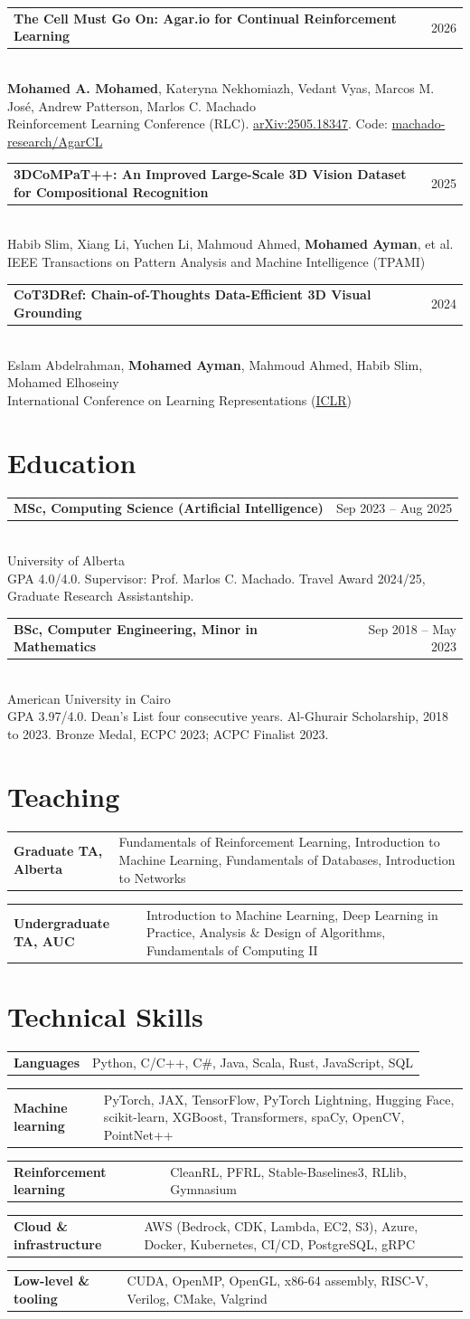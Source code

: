 \documentclass[10pt,a4paper]{article}
\makeatletter
\newcommand{\degree}[4]{%
  \vspace{4pt}
  \noindent\begin{tabularx}{\textwidth}{@{}Xr@{}}
    \textbf{#1} & \textcolor{muted}{\small #3}
  \end{tabularx}\\[1pt]
  \textcolor{accent}{#2}\\[1pt]
  {\small\textcolor{muted}{#4}}\vspace{2pt}
}
\newcommand{\paper}[4]{%
  \vspace{4pt}
  \noindent\begin{tabularx}{\textwidth}{@{}Xr@{}}
    \textbf{#1} & \textcolor{muted}{\small #4}
  \end{tabularx}\\[1pt]
  {\small #2}\\[1pt]
  {\small\textcolor{accent}{#3}}\vspace{2pt}
}
\newcommand{\skillrow}[2]{%
  \noindent\begin{tabularx}{\textwidth}{@{}p{3.6cm}X@{}}
    \textcolor{accent}{\footnotesize\textbf{#1}} & {\footnotesize #2}
  \end{tabularx}\vspace{1.5pt}
}
\makeatother
\begin{document}
\paper{The Cell Must Go On: Agar.io for Continual Reinforcement Learning}
{\textbf{Mohamed A. Mohamed}, Kateryna Nekhomiazh, Vedant Vyas, Marcos M. Jos\'e, Andrew Patterson, Marlos C. Machado}
{Reinforcement Learning Conference (RLC). \href{https://arxiv.org/abs/2505.18347}{arXiv:2505.18347}. Code: \href{https://github.com/machado-research/AgarCL}{machado-research/AgarCL}}{2026}

\paper{3DCoMPaT++: An Improved Large-Scale 3D Vision Dataset for Compositional Recognition}
{Habib Slim, Xiang Li, Yuchen Li, Mahmoud Ahmed, \textbf{Mohamed Ayman}, et al.}
{IEEE Transactions on Pattern Analysis and Machine Intelligence (TPAMI)}{2025}

\paper{CoT3DRef: Chain-of-Thoughts Data-Efficient 3D Visual Grounding}
{Eslam Abdelrahman, \textbf{Mohamed Ayman}, Mahmoud Ahmed, Habib Slim, Mohamed Elhoseiny}
{International Conference on Learning Representations (\href{https://openreview.net/forum?id=ORUiqcLpV6}{ICLR})}{2024}

\section{Education}

\degree{MSc, Computing Science (Artificial Intelligence)}{University of Alberta}{Sep 2023 -- Aug 2025}
{GPA 4.0/4.0. Supervisor: Prof. Marlos C. Machado. Travel Award 2024/25, Graduate Research Assistantship.}

\degree{BSc, Computer Engineering, Minor in Mathematics}{American University in Cairo}{Sep 2018 -- May 2023}
{GPA 3.97/4.0. Dean's List four consecutive years. Al-Ghurair Scholarship, 2018 to 2023. Bronze Medal, ECPC 2023; ACPC Finalist 2023.}

\section{Teaching}

\skillrow{Graduate TA, Alberta}{Fundamentals of Reinforcement Learning, Introduction to Machine Learning, Fundamentals of Databases, Introduction to Networks}
\skillrow{Undergraduate TA, AUC}{Introduction to Machine Learning, Deep Learning in Practice, Analysis \& Design of Algorithms, Fundamentals of Computing II}

\section{Technical Skills}
\enlargethispage{2\baselineskip}

\skillrow{Languages}{Python, C/C++, C\#, Java, Scala, Rust, JavaScript, SQL}
\skillrow{Machine learning}{PyTorch, JAX, TensorFlow, PyTorch Lightning, Hugging Face, scikit-learn, XGBoost, Transformers, spaCy, OpenCV, PointNet++}
\skillrow{Reinforcement learning}{CleanRL, PFRL, Stable-Baselines3, RLlib, Gymnasium}
\skillrow{Cloud \& infrastructure}{AWS (Bedrock, CDK, Lambda, EC2, S3), Azure, Docker, Kubernetes, CI/CD, PostgreSQL, gRPC}
\skillrow{Low-level \& tooling}{CUDA, OpenMP, OpenGL, x86-64 assembly, RISC-V, Verilog, CMake, Valgrind}
\end{document}
